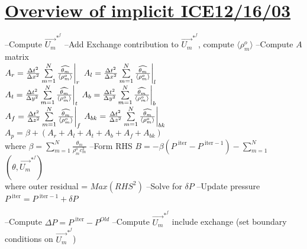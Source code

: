 \documentclass[fleqn]{article}
\newcommand{\SUM}[1]    {\ensuremath{\sum \limits_{{#1}=1}^N }}
\newcommand{\B}[1]      {\biggr{#1}}
\newcommand{\rhoM}      {\ensuremath{\rho^{o}_m}}
\newcommand{\rhoMFC}    {\ensuremath{\langle \rhoM \rangle}}
\newcommand{\delt}      {\ensuremath{\Delta{t}} }
\newcommand{\delx}      {\ensuremath{\Delta{x}} }
\newcommand{\dely}      {\ensuremath{\Delta{y}} }
\newcommand{\delz}      {\ensuremath{\Delta{z}} }
\newcommand{\velFC}     {\ensuremath{\vec{U_m}^{*^{f}} } }
\newcommand{\thetaUW}   {\ensuremath{\widehat{\theta_m}} }
\newcommand{\iter}      {\ensuremath{\text{ iter}}}
\begin{document}
\setlength{\abovedisplayskip}{0.1in}
\setlength{\mathindent}{0.0in}
\section{\underline{Overview of implicit ICE\hspace{ 0.5in}12/16/03}  }

\begin{algorithmic}
    \STATE --Compute $ \velFC$
    \STATE --Add Exchange contribution to  $\velFC $, compute $ \rhoMFC $
    \STATE --Compute $A$ matrix \\ \quad
      $A_r = \frac{\delt^2}{\delx^2} \SUM{m} \frac{\thetaUW}{\rhoMFC} \B{|}_{r}$ \quad
      $A_l = \frac{\delt^2}{\delx^2} \SUM{m} \frac{\thetaUW}{\rhoMFC} \B{|}_{l}$ \\ \quad
      $A_t = \frac{\delt^2}{\dely^2} \SUM{m} \frac{\thetaUW}{\rhoMFC} \B{|}_{t}$ \quad
      $A_b = \frac{\delt^2}{\dely^2} \SUM{m} \frac{\thetaUW}{\rhoMFC} \B{|}_{b}$ \\ \quad
      $A_f = \frac{\delt^2}{\delz^2} \SUM{m} \frac{\thetaUW}{\rhoMFC} \B{|}_{f}$ \quad
      $A_{bk} = \frac{\delt^2}{\delz^2} \SUM{m} \frac{\thetaUW}{\rhoMFC} \B{|}_{bk}$ \\ \quad
      $A_{p} =\beta +( A_r + A_l + A_t + A_b + A_f + A_ {bk})$\\ \quad
     where $\beta = \SUM{m} \frac{\theta_m}{\rhoM c_m^2}$
    \STATE --Form RHS $B = -\beta (P^{ \iter} - P^{ \iter -1}) - \SUM{m}$  $(\theta,\velFC)$ \\ \quad
    where outer residual = $Max(RHS^2)$
    \STATE --Solve for $\delta{P}$
    \STATE --Update pressure $P^{\iter} = P^{\iter -1 } + \delta{P}$
\ENDWHILE

\STATE --Compute $\Delta{P} = P^{\iter} - P^{Old}$
\STATE --Compute $\velFC$ include exchange (set boundary conditions on $\velFC$)
\end{algorithmic}
\newpage
\end{document}
